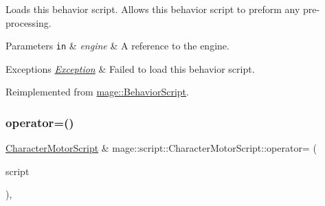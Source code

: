 Loads this behavior script. Allows this behavior script to preform any pre-\/processing.


\begin{DoxyParams}[1]{Parameters}
\mbox{\tt in}  & {\em engine} & A reference to the engine. \\
\hline
\end{DoxyParams}

\begin{DoxyExceptions}{Exceptions}
{\em \mbox{\hyperlink{classmage_1_1_exception}{Exception}}} & Failed to load this behavior script. \\
\hline
\end{DoxyExceptions}


Reimplemented from \mbox{\hyperlink{classmage_1_1_behavior_script_ae7864876b2ffb1d1d8d8a56e3099f1f2}{mage\+::\+Behavior\+Script}}.

\mbox{\label{classmage_1_1script_1_1_character_motor_script_aec26db7e08e315cf2461e860b1eaee4e}} 
\subsubsection{\texorpdfstring{operator=()}{operator=()}\hspace{0.1cm}{\footnotesize\ttfamily [1/2]}}
{\footnotesize\ttfamily \mbox{\hyperlink{classmage_1_1script_1_1_character_motor_script}{Character\+Motor\+Script}} \& mage\+::script\+::\+Character\+Motor\+Script\+::operator= (\begin{DoxyParamCaption}\item[{const \mbox{\hyperlink{classmage_1_1script_1_1_character_motor_script}{Character\+Motor\+Script}} \&}]{script }\end{DoxyParamCaption})\hspace{0.3cm}{\ttfamily [default]}, {\ttfamily [noexcept]}}

\mbox{\label{classmage_1_1script_1_1_character_motor_script_a284b9ecfd595278062cf3a16ebd90f43}} 
